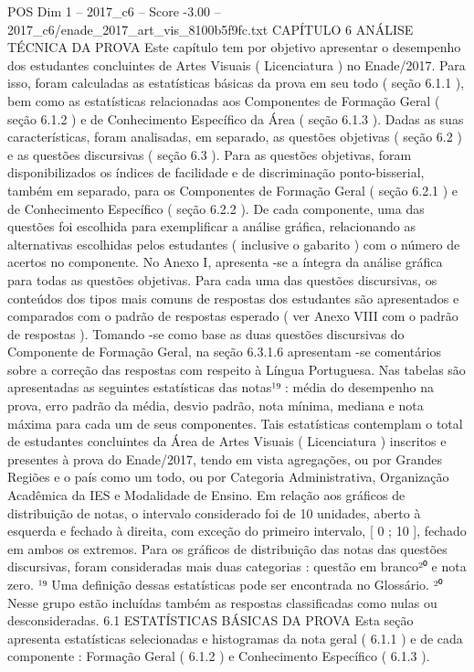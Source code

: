 \begin{textsample}{POS Dim 1 – 2017\_c6 – Score -3.00 – 2017\_c6/enade\_2017\_art\_vis\_8100b5f9fc.txt}  \label{ex:f1_pos_296}
CAPÍTULO 6 ANÁLISE TÉCNICA DA PROVA Este capítulo tem por objetivo apresentar o desempenho dos estudantes concluintes de Artes Visuais ( Licenciatura ) no Enade/2017.
Para isso, foram calculadas as estatísticas básicas da prova em seu todo ( seção 6.1.1 ), bem como as estatísticas relacionadas aos Componentes de Formação Geral ( seção 6.1.2 ) e de Conhecimento Específico da Área ( seção 6.1.3 ).
Dadas as suas características, foram analisadas, em separado, as questões objetivas ( seção 6.2 ) e as questões discursivas ( seção 6.3 ).
Para as questões objetivas, foram disponibilizados os índices de facilidade e de discriminação ponto-bisserial, também em separado, para os Componentes de Formação Geral ( seção 6.2.1 ) e de Conhecimento Específico ( seção 6.2.2 ).
De cada componente, uma das questões foi escolhida para exemplificar a análise gráfica, relacionando as alternativas escolhidas pelos estudantes ( inclusive o gabarito ) com o número de acertos no componente.
No Anexo I, apresenta -se a íntegra da análise gráfica para todas as questões objetivas.
Para cada uma das questões discursivas, os conteúdos dos tipos mais comuns de respostas dos estudantes são apresentados e comparados com o padrão de respostas esperado ( ver Anexo VIII com o padrão de respostas ).
Tomando -se como base as duas questões discursivas do Componente de Formação Geral, na seção 6.3.1.6 apresentam -se comentários sobre a correção das respostas com respeito à Língua Portuguesa.
Nas tabelas são apresentadas as seguintes estatísticas das notas¹⁹ : média do desempenho na prova, erro padrão da média, desvio padrão, nota mínima, mediana e nota máxima para cada um de seus componentes.
Tais estatísticas contemplam o total de estudantes concluintes da Área de Artes Visuais ( Licenciatura ) inscritos e presentes à prova do Enade/2017, tendo em vista agregações, ou por Grandes Regiões e o país como um todo, ou por Categoria Administrativa, Organização Acadêmica da IES e Modalidade de Ensino.
Em relação aos gráficos de distribuição de notas, o intervalo considerado foi de 10 unidades, aberto à esquerda e fechado à direita, com exceção do primeiro intervalo, [ 0 ; 10 ], fechado em ambos os extremos.
Para os gráficos de distribuição das notas das questões discursivas, foram consideradas mais duas categorias : questão em branco²⁰ e nota zero. ¹⁹ Uma definição dessas estatísticas pode ser encontrada no Glossário. ²⁰ Nesse grupo estão incluídas também as respostas classificadas como nulas ou desconsideradas. 6.1 ESTATÍSTICAS BÁSICAS DA PROVA Esta seção apresenta estatísticas selecionadas e histogramas da nota geral ( 6.1.1 ) e de cada componente : Formação Geral ( 6.1.2 ) e Conhecimento Específico ( 6.1.3 ).

\end{textsample}
